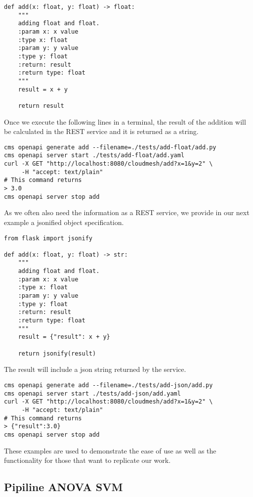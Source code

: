\begin{verbatim}
def add(x: float, y: float) -> float:
    """
    adding float and float.
    :param x: x value
    :type x: float
    :param y: y value
    :type y: float
    :return: result
    :return type: float
    """
    result = x + y

    return result
\end{verbatim}

Once we execute the following lines in a terminal, the result of the
addition will be calculated in the REST service and it is returned as a
string.

\begin{verbatim}
cms openapi generate add --filename=./tests/add-float/add.py
cms openapi server start ./tests/add-float/add.yaml 
curl -X GET "http://localhost:8080/cloudmesh/add?x=1&y=2" \
     -H "accept: text/plain"
# This command returns
> 3.0
cms openapi server stop add
\end{verbatim}

As we often also need the information as a REST service, we provide in
our next example a jsonified object specification.

\begin{verbatim}
from flask import jsonify

def add(x: float, y: float) -> str:
    """
    adding float and float.
    :param x: x value
    :type x: float
    :param y: y value
    :type y: float
    :return: result
    :return type: float
    """
    result = {"result": x + y}

    return jsonify(result)
\end{verbatim}

The result will include a json string returned by the service.

\begin{verbatim}
cms openapi generate add --filename=./tests/add-json/add.py
cms openapi server start ./tests/add-json/add.yaml 
curl -X GET "http://localhost:8080/cloudmesh/add?x=1&y=2" \
     -H "accept: text/plain"
# This command returns
> {"result":3.0}
cms openapi server stop add
\end{verbatim}

These examples are used to demonstrate the ease of use as well as the
functionality for those that want to replicate our work.


\subsection{Pipiline ANOVA SVM}\label{a.2.-pipiline-anova-svm}


